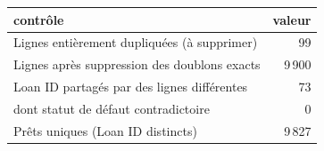 \begin{tabular}{lr}
\toprule
\textbf{contrôle} & \textbf{valeur} \\
\midrule
Lignes entièrement dupliquées (à supprimer) & 99 \\
Lignes après suppression des doublons exacts & 9\,900 \\
Loan ID partagés par des lignes différentes & 73 \\
dont statut de défaut contradictoire & 0 \\
Prêts uniques (Loan ID distincts) & 9\,827 \\
\bottomrule
\end{tabular}
